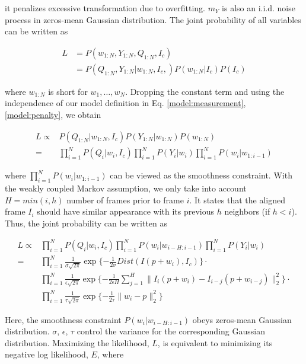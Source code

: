 \documentclass[10pt,journal]{IEEEtran}
\begin{document}
\noindent it penalizes excessive transformation due to overfitting. $m_Y$ is also an i.i.d. noise process in zeros-mean Gaussian distribution. The joint probability of all variables can be written as

\begin{align}
L&=P(w_{1:N},Y_{1:N},Q_{1:N},I_c) \\
 &=P(Q_{1:N},Y_{1:N}|w_{1:N},I_c,)P(w_{1:N}|I_c)P(I_c)
\end{align}

\noindent where $w_{1:N}$ is short for $w_1,\ldots,w_N$. Dropping the constant term and using the independence of our model definition in Eq. \ref{model:measurement}, \ref{model:penalty}, we obtain

\begin{align}
L\propto & P(Q_{1:N}|w_{1:N},I_c) P(Y_{1:N}|w_{1:N}) P(w_{1:N}) \\
				=& \prod_{i=1}^N{P(Q_i|w_i,I_c)} \prod_{i=1}^N{P(Y_i|w_i)} \prod_{i=1}^N {P(w_i|w_{1:i-1})}
\end{align}

\noindent where $\prod_{i=1}^N {P(w_i|w_{1:i-1})}$ can be viewed as the smoothness constraint. With the weakly coupled Markov assumption, we only take into account $H=min(i,h)$ number of frames prior to frame $i$. It states that the aligned frame $I_i$ should have similar appearance with its previous $h$ neighbors (if $h<i$). Thus, the joint probability can be written as 

\begin{align}
L\propto & \prod_{i=1}^N{P(Q_i|w_i,I_c)} \prod_{i=1}^N {P(w_i|w_{i-H:i-1})} \prod_{i=1}^N{P(Y_i|w_i)} \\
\label{data_exp}
				=& \prod_{i=1}^N \frac{1}{\sigma \sqrt{2\pi}} \exp\{-\frac{1}{2\sigma}Dist(I(p+w_i),I_c)\} \cdot \\
\label{smooth_exp}
				 &\prod_{i=1}^N \frac{1}{\epsilon \sqrt{2\pi}} \exp\{-\frac{1}{2\epsilon H}\sum_{j=1}^{H}\parallel{I_i(p+w_i)-I_{i-j}(p+w_{i-j})}\parallel_2^2\} \cdot \\
\label{penalty_exp}
				 &\prod_{i=1}^N \frac{1}{\tau \sqrt{2\pi}} \exp\{-\frac{1}{2\tau}\parallel{w_i-p}\parallel_2^2\}
\end{align}


Here, the smoothness constraint $P(w_i|w_{i-H:i-1})$ obeys zeros-mean Gaussian distribution. $\sigma$, $\epsilon$, $\tau$ control the variance for the corresponding Gaussian distribution. Maximizing the likelihood, $L$, is equivalent to minimizing its negative log likelihood, $E$, where
\end{document}
